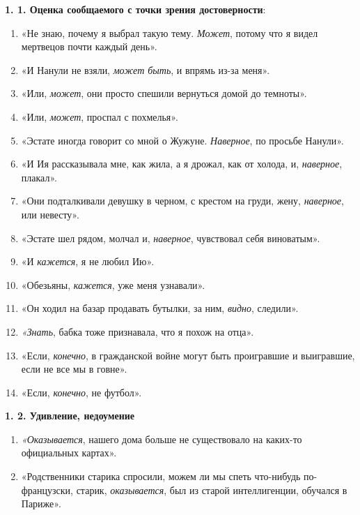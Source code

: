 \documentclass{kursa4}
\begin{document}
      {\par}

      \textbf{1. 1. Оценка сообщаемого с точки зрения достоверности}: \begin{enumerate}
        \item «Не знаю, почему я выбрал такую тему. \textit{Может}, потому что я видел мертвецов почти каждый день». \item «И Нанули не взяли, \textit{может быть}, и впрямь из-за меня». \item «Или, \textit{может}, они просто спешили вернуться домой до темноты». \item «Или, \textit{может}, проспал с похмелья». \item «Эстате иногда говорит со мной о Жужуне. \textit{Наверное}, по просьбе Нанули». 
        \item «И Ия рассказывала мне, как жила, а я дрожал, как от холода, и, \textit{наверное}, плакал». \item «Они подталкивали девушку в черном, с крестом на груди, жену, \textit{наверное}, или невесту». 
        \item «Эстате шел рядом, молчал и, \textit{наверное}, чувствовал себя виноватым». \item «И \textit{кажется}, я не любил Ию». \item «Обезьяны, \textit{кажется}, уже меня узнавали». \item «Он ходил на базар продавать бутылки, за ним, \textit{видно}, следили». \item \textit{«Знать}, бабка тоже признавала, что я похож на отца». \item «Если, \textit{конечно}, в гражданской войне могут быть проигравшие и выигравшие, если не все мы в говне». \item «Если, \textit{конечно}, не футбол». \end{enumerate}

      \textbf{1. 2. Удивление, недоумение}
        \setcounter{saveenum}{\value{enumi}}
        \begin{enumerate}
        \setcounter{enumi}{\value{saveenum}}
        \item \textit{«Оказывается}, нашего дома больше не существовало на каких-то официальных картах». \item «Родственники старика спросили, можем ли мы спеть что-нибудь по-французски, старик, \textit{оказывается}, был из старой интеллигенции, обучался в Париже». \end{enumerate}
\end{document}
